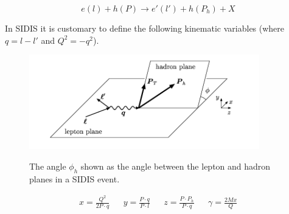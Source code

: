 \begin{equation}
  e(l) + h(P) \rightarrow e'(l') + h(P_{h}) + X 
\end{equation}

In SIDIS it is customary to define the following kinematic variables (where $q = l - l'$ and $Q^{2} = -q^{2}$). 

\begin{figure}
  \centering
  \includegraphics[width=10cm]{image/PhiHadron.png}
  \label{fig:dis}
  \caption{ The angle $\phi_h$ shown as the angle between the lepton and hadron planes in a SIDIS event. }
\end{figure}

\begin{align}
  x = \frac{Q^{2}}{2P \cdot q} && y = \frac{P \cdot q}{P \cdot l} && z = \frac{P \cdot P_{h}}{P \cdot q} && \gamma = \frac{2Mx}{Q}
\end{align}

